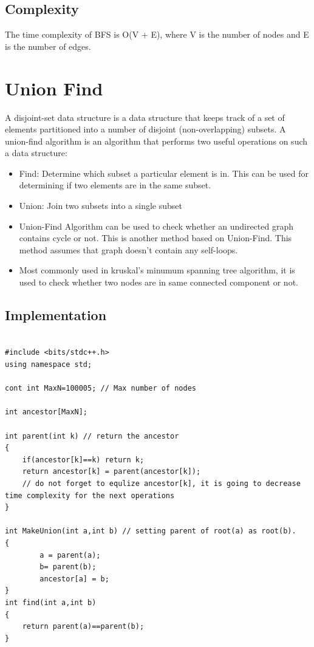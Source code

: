 \documentclass[12pt]{article}
\begin{document}
\subsection{Complexity}
The time complexity of BFS is O(V + E), where V is the number of nodes and E is the number of edges.


\section{Union Find}
    A disjoint-set data structure is a data structure that keeps track of a set of elements partitioned into a number of disjoint (non-overlapping) subsets. A union-find algorithm is an algorithm that performs two useful operations on such a data structure:
    \begin{itemize}
        \item Find: Determine which subset a particular element is in. This can be used for determining if two elements are in the same subset.

        \item Union: Join two subsets into a single subset
        
        \item Union-Find Algorithm can be used to check whether an undirected graph contains cycle or not. This is another method based on Union-Find. This method assumes that graph doesn’t contain any self-loops. 
        \item Most commonly used in kruskal's minumum spanning tree algorithm, it is used to check whether two nodes are in same connected component or not.
    \end{itemize}
    \subsection{Implementation}
    
\begin{verbatim}

#include <bits/stdc++.h>
using namespace std;

cont int MaxN=100005; // Max number of nodes

int ancestor[MaxN];

int parent(int k) // return the ancestor
{
    if(ancestor[k]==k) return k;
    return ancestor[k] = parent(ancestor[k]); 
    // do not forget to equlize ancestor[k], it is going to decrease time complexity for the next operations
}

int MakeUnion(int a,int b) // setting parent of root(a) as root(b).
{
        a = parent(a);
        b= parent(b);
        ancestor[a] = b;
}
int find(int a,int b)
{
    return parent(a)==parent(b);
}
\end{verbatim}
\end{document}
